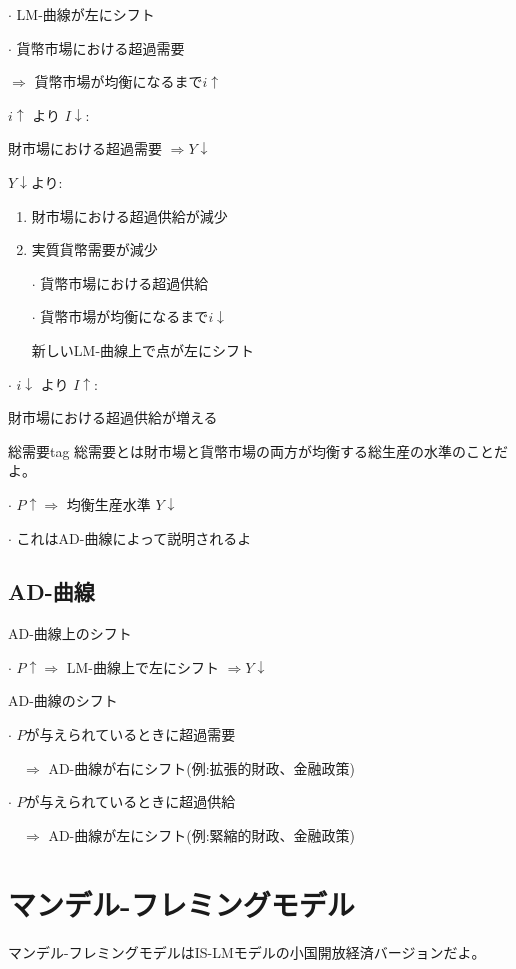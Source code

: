 \documentclass[a4paper, 12pt]{article}
\begin{document}
  \quad $\cdot$ LM-曲線が左にシフト

  \quad $\cdot$ 貨幣市場における超過需要

  $\Rightarrow$ 貨幣市場が均衡になるまで$i \uparrow$

  \noindent
$i \uparrow$ より $I \downarrow$:

  \quad 財市場における超過需要
  \quad $\Rightarrow Y \downarrow$

  \noindent
$Y \downarrow$より:
  \begin{enumerate}
    \item 財市場における超過供給が減少
    \item 実質貨幣需要が減少

    \qquad $\cdot$ 貨幣市場における超過供給

    \qquad $\cdot$ 貨幣市場が均衡になるまで$i \downarrow$

\qquad 新しいLM-曲線上で点が左にシフト
    \end{enumerate}


  \noindent
  $\cdot$ $i \downarrow$ より $I \uparrow$:

	\quad 財市場における超過供給が増える

\begin{definition1}{総需要}{tag}
総需要とは財市場と貨幣市場の両方が均衡する総生産の水準のことだよ。
\end{definition1}
$\cdot$ $P \uparrow \Rightarrow$ 均衡生産水準 $Y \downarrow$

$\cdot$ これはAD-曲線によって説明されるよ

\subsection{AD-曲線}
\quad AD-曲線上のシフト

\qquad $\cdot$ $P \uparrow \Rightarrow$ LM-曲線上で左にシフト $\Rightarrow Y
\downarrow$

\noindent
\quad AD-曲線のシフト

\qquad $\cdot$ $P$が与えられているときに超過需要

\qquad \ \ $\Rightarrow$ AD-曲線が右にシフト(例:拡張的財政、金融政策)

\qquad $\cdot$ $P$が与えられているときに超過供給

\qquad \ \ $\Rightarrow$ AD-曲線が左にシフト(例:緊縮的財政、金融政策)

\newpage

\section{マンデル-フレミングモデル}
マンデル-フレミングモデルはIS-LMモデルの小国開放経済バージョンだよ。
\end{document}
